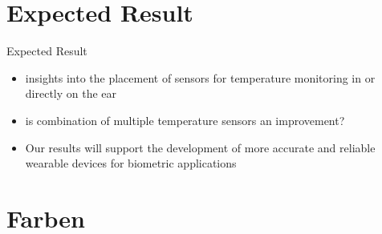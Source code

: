 \documentclass[en]{sdqbeamer}
\begin{document}
\section{Expected Result}
\begin{frame}{Expected Result}
    \begin{itemize}
        \item insights into the placement of sensors for temperature monitoring in or directly on the ear
        \item is combination of multiple temperature sensors an improvement?
        \item Our results will support the development of more accurate and reliable wearable devices for biometric applications
    \end{itemize}
\end{frame}

\appendix
\beginbackup




\section{Farben}
\backupend
\end{document}

